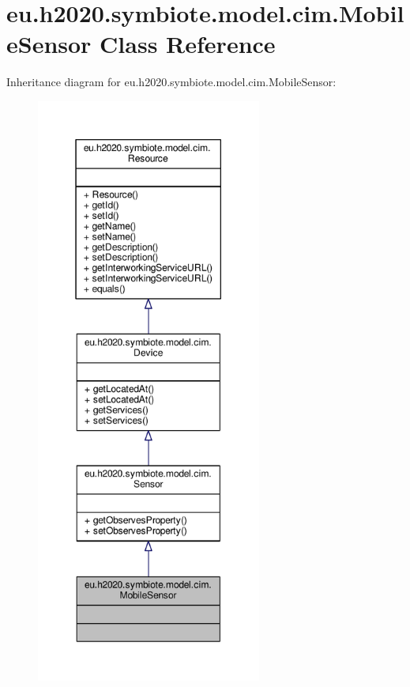 \hypertarget{classeu_1_1h2020_1_1symbiote_1_1model_1_1cim_1_1MobileSensor}{}\section{eu.\+h2020.\+symbiote.\+model.\+cim.\+Mobile\+Sensor Class Reference}
\label{classeu_1_1h2020_1_1symbiote_1_1model_1_1cim_1_1MobileSensor}


Inheritance diagram for eu.\+h2020.\+symbiote.\+model.\+cim.\+Mobile\+Sensor\+:\nopagebreak
\begin{figure}[H]
\begin{center}
\leavevmode
\includegraphics[height=550pt]{classeu_1_1h2020_1_1symbiote_1_1model_1_1cim_1_1MobileSensor__inherit__graph}
\end{center}
\end{figure}


